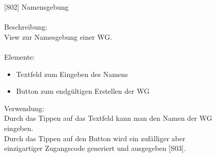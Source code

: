 \documentclass[a4paper]{scrreprt}
\begin{document}
\begin{figure}[h!]
    		\begin{minipage}[t]{0.55\linewidth}
    			\flushleft
    			\vspace{9mm}
    			{[}S02{]} Namensgebung\\
    			\hfill
    			\\Beschreibung: \\
    			View zur Namesgebung einer WG.\\
    			\hfill
    			\\Elemente:
    			\begin{itemize}
    				\renewcommand\labelitemi{--}
    				\item Textfeld zum Eingeben des Namens
    				\item Button zum endgültigen Erstellen der WG
    				
    			\end{itemize}
    		
    			\hfill
    			
    			Verwendung:\\
    			Durch das Tippen auf das Textfeld kann man
    			den Namen der WG eingeben. \\
    			Durch das Tippen auf den Button wird ein 
    			zufälliger aber einzigartiger Zugangscode 
    			generiert und ausgegeben {[}S03{]}.
    			
    			
    			
    		\end{minipage}
    	\end{figure}
    
    	\clearpage
    	
\end{document}
